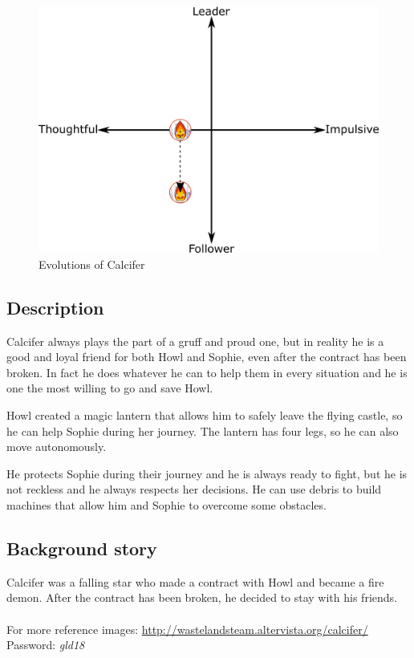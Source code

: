 \begin{figure}[H]
  \centering
   \includegraphics[width=14cm]{Images/Diagrams/Evolutions/calciferEvolution}
  \caption{Evolutions of Calcifer}
\end{figure}

\subsection{Description}
Calcifer always plays the part of a gruff and proud one, but in reality he is a good and loyal friend for both Howl and Sophie, even after the contract has been broken. In fact he does whatever he can to help them in every situation and he is one the most willing to go and save Howl.

Howl created a magic lantern that allows him to safely leave the flying castle, so he can help Sophie during her journey. The lantern has four legs, so he can also move autonomously.

He protects Sophie during their journey and he is always ready to fight, but he is not reckless and he always respects her decisions. He can use debris to build machines that allow him and Sophie to overcome some obstacles.

\subsection{Background story}
Calcifer was a falling star who made a contract with Howl and became a fire demon. After the contract has been broken, he decided to stay with his friends.
\\\\
For more reference images: \href{http://wastelandsteam.altervista.org/calcifer/}{http://wastelandsteam.altervista.org/calcifer/}\\
Password: \textit{gld18}
